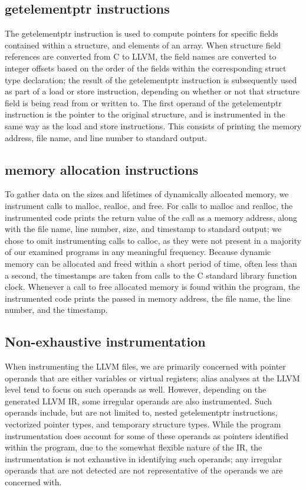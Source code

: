 \subsection{getelementptr instructions}
The getelementptr instruction is used to compute pointers for specific fields contained within a structure, and elements of an array. When structure field references are converted from C to LLVM, the field names are converted to integer offsets based on the order of the fields within the corresponding struct type declaration; the result of the getelementptr instruction is subsequently used as part of a load or store instruction, depending on whether or not that structure field is being read from or written to. The first operand of the getelementptr instruction is the pointer to the original structure, and is instrumented in the same way as the load and store instructions. This consists of printing the memory address, file name, and line number to standard output.

\subsection{memory allocation instructions}
To gather data on the sizes and lifetimes of dynamically allocated memory, we instrument calls to malloc, realloc, and free. For calls to malloc and realloc, the instrumented code prints the return value of the call as a memory address, along with the file name, line number, size, and timestamp to standard output; we chose to omit instrumenting calls to calloc, as they were not present in a majority of our examined programs in any meaningful frequency. Because dynamic memory can be allocated and freed within a short period of time, often less than a second, the timestamps are taken from calls to the C standard library function clock. Whenever a call to free allocated memory is found within the program, the instrumented code prints the passed in memory address, the file name, the line number, and the timestamp.

\subsection{Non-exhaustive instrumentation}
When instrumenting the LLVM files, we are primarily concerned with pointer operands that are either variables or virtual registers; alias analyses at the LLVM level tend to focus on such operands as well. However, depending on the generated LLVM IR, some irregular operands are also instrumented. Such operands include, but are not limited to, nested getelementptr instructions, vectorized pointer types, and temporary structure types. While the program instrumentation does account for some of these operands as pointers identified within the program, due to the somewhat flexible nature of the IR, the instrumentation is not exhaustive in identifying such operands; any irregular operands that are not detected are not representative of the operands we are concerned with.
